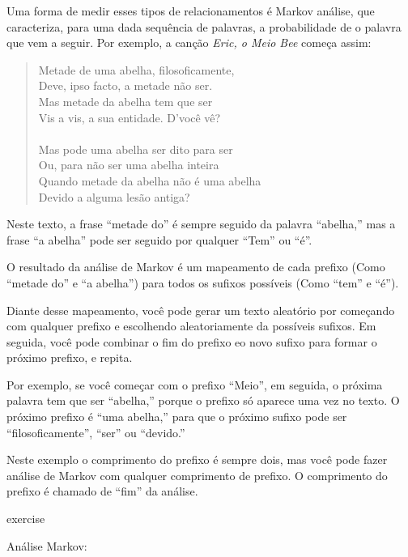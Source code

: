 \documentclass[10pt]{book}
\begin{document}
\begin{exercise}
\begin{v erbatim}
Uma forma de medir esses tipos de relacionamentos é Markov
análise, que
caracteriza, para uma dada sequência de palavras, a probabilidade de o
palavra que vem a seguir. Por exemplo, a canção {\em Eric, o Meio
  Bee} começa assim:

\begin{quote}
Metade de uma abelha, filosoficamente, \\
Deve, ipso facto, a metade não ser. \\
Mas metade da abelha tem que ser \\
Vis a vis, a sua entidade. D'você vê? \\
\\
Mas pode uma abelha ser dito para ser \\
Ou, para não ser uma abelha inteira \\
Quando metade da abelha não é uma abelha \\
Devido a alguma lesão antiga? \\
\end{quote}
%
Neste texto,
a frase ``metade do'' é sempre seguido da palavra ``abelha,''
mas a frase ``a abelha'' pode ser seguido por qualquer
``Tem'' ou ``é''.

O resultado da análise de Markov é um mapeamento de cada prefixo
(Como ``metade do'' e ``a abelha'') para todos os sufixos possíveis
(Como ``tem'' e ``é'').

Diante desse mapeamento, você pode gerar um texto aleatório por
começando com qualquer prefixo e escolhendo aleatoriamente da
possíveis sufixos. Em seguida, você pode combinar o fim do
prefixo eo novo sufixo para formar o próximo prefixo, e repita.

Por exemplo, se você começar com o prefixo ``Meio'', em seguida, o
próxima palavra tem que ser ``abelha,'' porque o prefixo só aparece
uma vez no texto. O próximo prefixo é ``uma abelha,'' para que o
próximo sufixo pode ser ``filosoficamente'', ``ser'' ou ``devido.''

Neste exemplo o comprimento do prefixo é sempre dois, mas
você pode fazer análise de Markov com qualquer comprimento de prefixo. O comprimento
do prefixo é chamado de ``fim'' da análise.

\begin{} exercise

Análise Markov:

\begin{enumerate}


\end{enumerate}
\end{}
\end{v erbatim}
\end{exercise}
\end{document}
